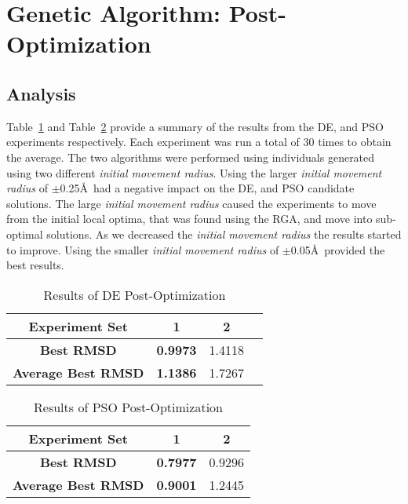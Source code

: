 \section{Genetic Algorithm: Post-Optimization}
\label{sec:post-op-analysis}

\subsection{Analysis}

Table~\ref{table:post-op-de-results} and Table~\ref{table:post-op-pso-results} provide a summary of the results from the DE, and PSO experiments respectively. Each experiment was run a total of 30 times to obtain the average. The two algorithms were performed using individuals generated using two different \textit{initial movement radius}. Using the larger \textit{initial movement radius} of $\pm$0.25\AA\ had a negative impact on the DE, and PSO candidate solutions. The large \textit{initial movement radius} caused the experiments to move from the initial local optima, that was found using the RGA, and move into sub-optimal solutions. As we decreased the \textit{initial movement radius} the results started to improve. Using the smaller \textit{initial movement radius} of $\pm$0.05\AA\ provided the best results.

\begin{table}
	\centering
	\begin{tabular}{ | >{\bfseries}c | c | c | c | }
		\hline
		Experiment Set & 1 & 2 \\ \hline
		Best RMSD & \textbf{0.9973} & 1.4118 \\ \hline
		Average Best RMSD & \textbf{1.1386} & 1.7267 \\ \hline
	\end{tabular}
	\caption{Results of DE Post-Optimization}
	\label{table:post-op-de-results}
\end{table}

\begin{table}
	\centering
	\begin{tabular}{ | >{\bfseries}c | c | c | }
		\hline
		Experiment Set & 1 & 2 \\ \hline
		Best RMSD & \textbf{0.7977} & 0.9296 \\ \hline
		Average Best RMSD & \textbf{0.9001} & 1.2445 \\ \hline
	\end{tabular}
	\caption{Results of PSO Post-Optimization}
	\label{table:post-op-pso-results}
\end{table}

